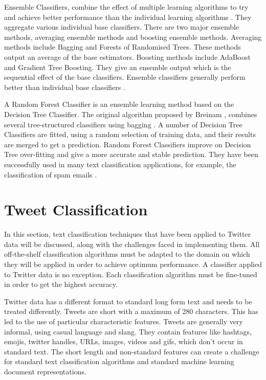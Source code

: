 Ensemble Classifiers, combine the effect of multiple learning algorithms to try and achieve better performance than the individual learning algorithms \cite{dietterich2000ensemble}. They aggregate various individual base classifiers. There are two major ensemble methods, averaging ensemble methods and boosting ensemble methods. Averaging methods include Bagging and Forests of Randomised Trees. These methods output an average of the base estimators. Boosting methods include AdaBoost and Gradient Tree Boosting. They give an ensemble output which is the sequential effect of the base classifiers. Ensemble classifiers generally perform better than individual base classifiers \cite{Opitz1999}. 

A Random Forest Classifier is an ensemble learning method based on the Decision Tree Classifier. The original algorithm proposed by Breinam \cite{Breiman2001}, combines several tree-structured classifiers using bagging \cite{breiman1996bagging}. A number of Decision Tree Classifiers are fitted, using a random selection of training data, and their results are merged to get a prediction. Random Forest Classifiers improve on Decision Tree over-fitting and give a more accurate and stable prediction. They have been successfully used in many text classification applications, for example, the classification of spam emails \cite{akinyelu2014}.

\section{Tweet Classification}

In this section, text classification techniques that have been applied to Twitter data will be discussed, along with the challenges faced in implementing them. All off-the-shelf classification algorithms must be adapted to the domain on which they will be applied in order to achieve optimum performance. A classifier applied to Twitter data is no exception. Each classification algorithm must be fine-tuned in order to get the highest accuracy. 

Twitter data has a different format to standard long form text and needs to be treated differently. Tweets are short with a maximum of 280 characters. This has led to the use of particular characteristic features. Tweets are generally very informal, using casual language and slang. They contain features like hashtags, emojis, twitter handles, URLs, images, videos and gifs, which don't occur in standard text. The short length and non-standard features can create a challenge for standard text classification algorithms and standard machine learning document representations. 

